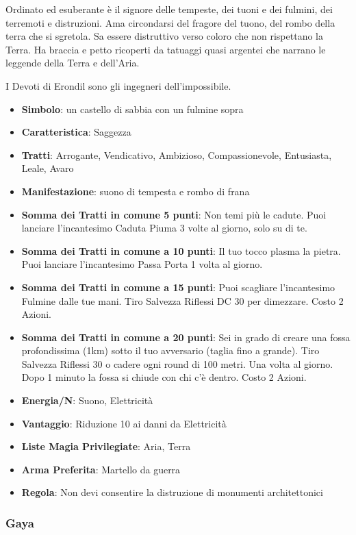 \begin{multicols}{2}
Ordinato ed esuberante è il signore delle tempeste, dei tuoni e dei fulmini, dei terremoti e distruzioni. Ama circondarsi del fragore del tuono, del rombo della terra che si sgretola. Sa essere distruttivo verso coloro che non rispettano la Terra.
Ha braccia e petto ricoperti da tatuaggi quasi argentei che narrano le leggende della Terra e dell'Aria.

I Devoti di Erondil sono gli ingegneri dell'impossibile.

\begin{itemize}[leftmargin=*] \setlength{\itemsep}{0pt}
\item \textbf{Simbolo}: un castello di sabbia con un fulmine sopra
\item \textbf{Caratteristica}: Saggezza
\item \textbf{Tratti}: Arrogante, Vendicativo, Ambizioso, Compassionevole, Entusiasta, Leale, Avaro
\item \textbf{Manifestazione}: suono di tempesta e rombo di frana
\item \textbf{Somma dei Tratti in comune 5 punti}: Non temi più le cadute. Puoi lanciare l'incantesimo Caduta Piuma 3 volte al giorno, solo su di te.
\item \textbf{Somma dei Tratti in comune a 10 punti}: Il tuo tocco plasma la pietra. Puoi lanciare l'incantesimo Passa Porta 1 volta al giorno.
\item \textbf{Somma dei Tratti in comune a 15 punti}: Puoi scagliare l'incantesimo Fulmine dalle tue mani. Tiro Salvezza Riflessi DC 30 per dimezzare. Costo 2 Azioni.
\item \textbf{Somma dei Tratti in comune a 20 punti}: Sei in grado di creare una fossa profondissima (1km) sotto il tuo avversario (taglia fino a grande). Tiro Salvezza Riflessi 30 o cadere ogni round di 100 metri. Una volta al giorno. Dopo 1 minuto la fossa si chiude con chi c'è dentro. Costo 2 Azioni.
\item \textbf{Energia/N}: Suono, Elettricità
\item \textbf{Vantaggio}: Riduzione 10 ai danni da Elettricità
\item \textbf{Liste Magia Privilegiate}: Aria, Terra
\item \textbf{Arma Preferita}: Martello da guerra
\item \textbf{Regola}: Non devi consentire la distruzione di monumenti architettonici
\end{itemize}

\subsubsection{Gaya}\label{gaya}\hypertarget{gaya}{}


\end{multicols}
